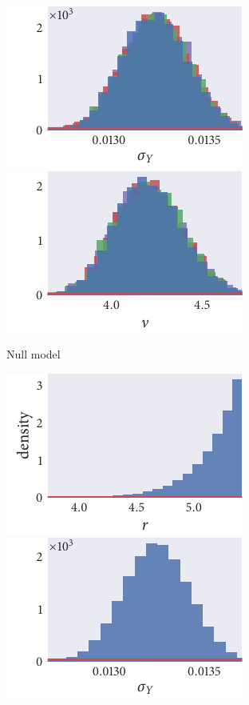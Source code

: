 \begin{figure}[p]
  \begin{subfigure}[b]{\textwidth}
    \centering
    \includegraphics{seq2/null_hist_sigma_Y.pdf}\hspace{0.01\textwidth}
    \includegraphics{seq2/null_hist_nu.pdf}
    \caption{Null model}
  \end{subfigure}
  \begin{subfigure}[b]{\textwidth}
    \includegraphics{seq2/r_hist_r.pdf}%
    \includegraphics{seq2/r_hist_sigma_Y.pdf}%

\end{subfigure}
\end{figure}

